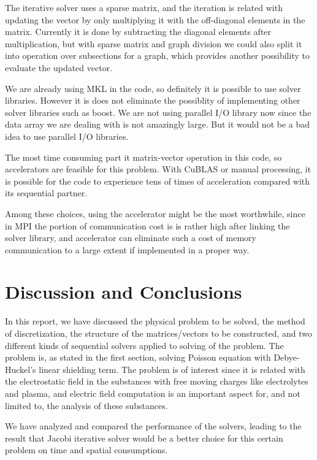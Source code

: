 \documentclass{article}
\begin{document}
\begin{spacing}{1.1}
The iterative solver uses a sparse matrix, and the iteration is related with updating the vector by only multiplying it with the off-diagonal elements in the matrix. Currently it is done by subtracting the diagonal elements after multiplication, but with sparse matrix and graph division we could also split it into operation over subsections for a graph, which provides another possibility to evaluate the updated vector.

We are already using MKL in the code, so definitely it is possible to use solver libraries. However it is does not eliminate the possiblity of implementing other solver libraries such as boost. We are not using parallel I/O library now since the data array we are dealing with is not amazingly large. But it would not be a bad idea to use parallel I/O libraries.

The most time consuming part it matrix-vector operation in this code, so accelerators are feasible for this problem. With CuBLAS or manual processing, it is possible for the code to experience tens of times of acceleration compared with its sequential partner.

Among these choices, using the accelerator might be the most worthwhile, since in MPI the portion of communication cost is is rather high after linking the solver library, and accelerator can eliminate such a cost of memory communication to a large extent if implemented in a proper way.

\section{Discussion and Conclusions}

In this report, we have discussed the physical problem to be solved, the method of discretization, the structure of the matrices/vectors to be constructed, and two different kinds of sequential solvers applied to solving of the problem.
The problem is, as stated in the first section, solving Poisson equation with Debye-Huckel's linear shielding term. The problem is of interest since it is related with the electrostatic field in the substances with free moving charges like electrolytes and plasma, and electric field computation is an important aspect for, and not limited to, the analysis of these substances.

We have analyzed and compared the performance of the solvers, leading to the result that Jacobi iterative solver would be a better choice for this certain problem on time and spatial consumptions.


\end{spacing}
\end{document}
